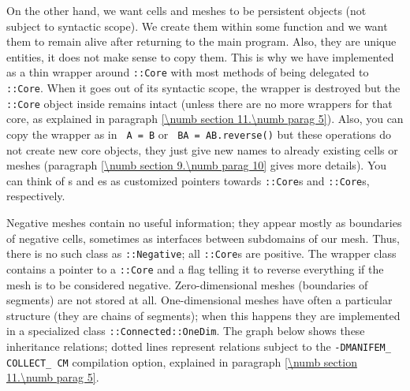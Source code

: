 On the other hand, we want cells and meshes to be persistent objects (not subject to
syntactic scope).
We create them within some function and we want them to remain alive after returning
to the main program.
Also, they are unique entities, it does not make sense to copy them.
This is why we have implemented {\small\tt {}} as a thin wrapper around
{\small\tt {}::Core}
with most methods of {\small\tt {}} being delegated to {\small\tt {}::Core}.
When it goes out of its syntactic scope, the wrapper is destroyed but the {\small\tt {}::Core}
object inside remains intact (unless there are no more wrappers for that core, as explained in
paragraph \ref{\numb section 11.\numb parag 5}).
Also, you can copy the wrapper as in {\small\tt {} A = B} or {\small\tt {} BA = AB.reverse()}
but these operations do not create new core objects, they just give new names to
already existing cells or meshes (paragraph \ref{\numb section 9.\numb parag 10} gives
more details).
You can think of {\small\tt {}}s and {\small\tt {}}es as customized pointers towards
{\small\tt {}::Core}s and {\small\tt {}::Core}s, respectively.

Negative meshes contain no useful information; they appear mostly as boundaries
of negative cells, sometimes as interfaces between subdomains of our mesh.
Thus, there is no such class as {\small\tt {}::Negative};
all {\small\tt {}::Core}s are positive.
The wrapper class {\small\tt {}} contains a pointer to a {\small\tt {}::Core}
and a flag telling it to reverse everything if the mesh is to be considered negative.
Zero-dimensional meshes (boundaries of segments) are not stored at all.
One-dimensional meshes have often a particular structure (they are chains of segments);
when this happens they are implemented in a specialized class {\small\tt {}::Connected::OneDim}.
The graph below shows these inheritance relations; dotted lines represent relations subject to
the {\small\tt -DMANIFEM\_\,COLLECT\_\,CM} compilation option, explained in paragraph
\ref{\numb section 11.\numb parag 5}.

